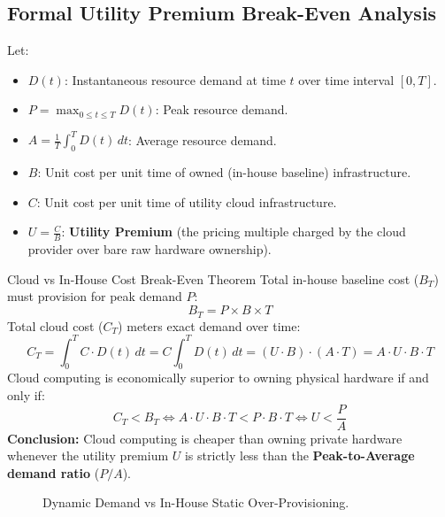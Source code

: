 \documentclass[11pt,a4paper,openany]{report}
\begin{document}
\subsection{Formal Utility Premium Break-Even Analysis}
Let:
\begin{itemize}[leftmargin=*]
  \item $D(t)$: Instantaneous resource demand at time $t$ over time interval $[0, T]$.
  \item $P = \max_{0 \le t \le T} D(t)$: Peak resource demand.
  \item $A = \frac{1}{T} \int_{0}^{T} D(t)\, dt$: Average resource demand.
  \item $B$: Unit cost per unit time of owned (in-house baseline) infrastructure.
  \item $C$: Unit cost per unit time of utility cloud infrastructure.
  \item $U = \frac{C}{B}$: \textbf{Utility Premium} (the pricing multiple charged by the cloud provider over bare raw hardware ownership).
\end{itemize}

\begin{thmbox}{Cloud vs In-House Cost Break-Even Theorem}
Total in-house baseline cost ($B_T$) must provision for peak demand $P$:
\begin{equation}
B_T = P \times B \times T
\end{equation}
Total cloud cost ($C_T$) meters exact demand over time:
\begin{equation}
C_T = \int_{0}^{T} C \cdot D(t)\, dt = C \int_{0}^{T} D(t)\, dt = (U \cdot B) \cdot (A \cdot T) = A \cdot U \cdot B \cdot T
\end{equation}
Cloud computing is economically superior to owning physical hardware if and only if:
\begin{equation}
C_T < B_T \iff A \cdot U \cdot B \cdot T < P \cdot B \cdot T \iff U < \frac{P}{A}
\end{equation}
\textbf{Conclusion:} Cloud computing is cheaper than owning private hardware whenever the utility premium $U$ is strictly less than the \textbf{Peak-to-Average demand ratio} ($P/A$).
\end{thmbox}

\begin{figure}[H]
\centering
{}
\caption{Dynamic Demand vs In-House Static Over-Provisioning.}
\end{figure}
\end{document}
